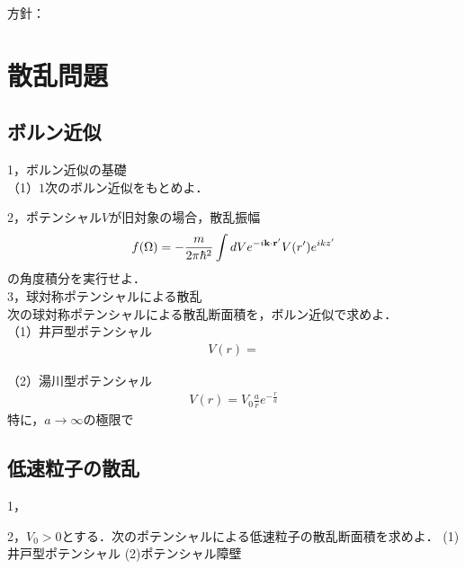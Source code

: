 \documentclass[a4j]{jarticle}
\begin{document}
方針：





\section{散乱問題}
\subsection{ボルン近似}
1，ボルン近似の基礎\\
（1）$1$次のボルン近似をもとめよ．


2，ポテンシャル$V$が旧対象の場合，散乱振幅
\begin{align*}
 f(\Omega)=-\frac{m}{2\pi \hbar^2}\int dV e^{-i{\bf k }\cdot {\bf r'}}V(r')e^{ikz'}
\end{align*}
の角度積分を実行せよ．\\

3，球対称ポテンシャルによる散乱\\
次の球対称ポテンシャルによる散乱断面積を，ボルン近似で求めよ．\\
（1）井戸型ポテンシャル
\begin{align*}
 V(r)=
\end{align*}

（2）湯川型ポテンシャル
\begin{align*}
 V(r)=V_0\frac{a}{r}e^{-\frac{r}{a}}
\end{align*}
特に，$a\to\infty$の極限で

\subsection{低速粒子の散乱}
1，

2，$V_0>0$とする．次のポテンシャルによる低速粒子の散乱断面積を求めよ．
(1)井戸型ポテンシャル
(2)ポテンシャル障壁
\end{document}

